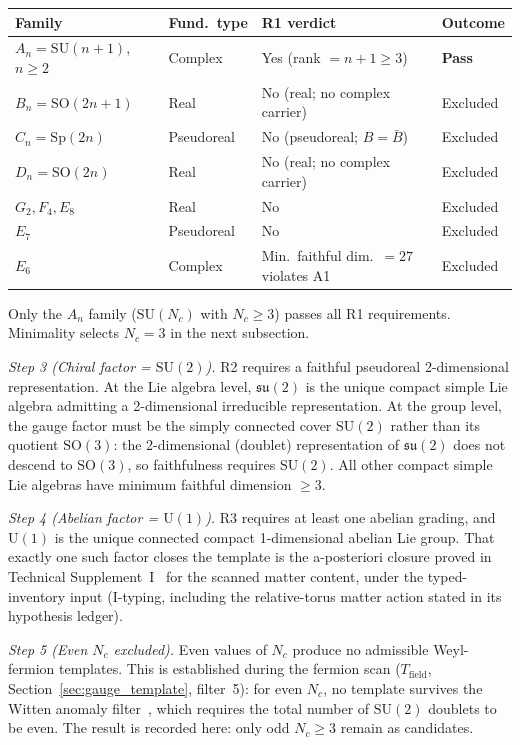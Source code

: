 \documentclass[11pt]{article}
\newcommand{\SU}{\mathrm{SU}}
\newcommand{\U}{\mathrm{U}}
\begin{document}
\begin{tcolorbox}[apfbox, title={Lemma $L_{\mathrm{gauge,unique}}$ (Gauge Template Uniqueness)}]
\smallskip
\begin{center}
\small
\begin{tabular}{llp{4.2cm}l}
\toprule
\textbf{Family} & \textbf{Fund.\ type} & \textbf{R1 verdict} & \textbf{Outcome} \\
\midrule
$A_n = \SU(n\!+\!1)$, $n \ge 2$ & Complex & Yes (rank $= n+1 \ge 3$) & \textbf{Pass} \\
$B_n = \mathrm{SO}(2n\!+\!1)$ & Real & No (real; no complex carrier) & Excluded \\
$C_n = \mathrm{Sp}(2n)$ & Pseudoreal & No (pseudoreal; $B = \bar{B}$) & Excluded \\
$D_n = \mathrm{SO}(2n)$ & Real & No (real; no complex carrier) & Excluded \\
$G_2, F_4, E_8$ & Real & No & Excluded \\
$E_7$ & Pseudoreal & No & Excluded \\
$E_6$ & Complex & Min.\ faithful dim.\ $= 27$ violates A1 & Excluded \\
\bottomrule
\end{tabular}
\end{center}
\smallskip

Only the $A_n$ family ($\SU(N_c)$ with $N_c \ge 3$) passes all R1 requirements.  Minimality selects $N_c = 3$ in the next subsection.

\medskip\noindent\textit{Step 3 (Chiral factor = $\SU(2)$).}  R2 requires a faithful pseudoreal 2-dimensional representation.  At the Lie algebra level, $\mathfrak{su}(2)$ is the unique compact simple Lie algebra admitting a 2-dimensional irreducible representation.  At the group level, the gauge factor must be the simply connected cover $\SU(2)$ rather than its quotient $\mathrm{SO}(3)$: the 2-dimensional (doublet) representation of $\mathfrak{su}(2)$ does not descend to $\mathrm{SO}(3)$, so faithfulness requires $\SU(2)$.  All other compact simple Lie algebras have minimum faithful dimension $\ge 3$.

\medskip\noindent\textit{Step 4 (Abelian factor = $\U(1)$).}  R3 requires at least one abelian grading, and $\U(1)$ is the unique connected compact 1-dimensional abelian Lie group.  That exactly one such factor closes the template is the a-posteriori closure proved in Technical Supplement~I~\cite{BrookeP2Supplement} for the scanned matter content, under the typed-inventory input (I-typing, including the relative-torus matter action stated in its hypothesis ledger).

\medskip\noindent\textit{Step 5 (Even $N_c$ excluded).}  Even values of $N_c$ produce no admissible Weyl-fermion templates.  This is established during the fermion scan ($T_{\mathrm{field}}$, Section~\ref{sec:gauge_template}, filter~5): for even $N_c$, no template survives the Witten anomaly filter~\cite{Witten1982}, which requires the total number of $\SU(2)$ doublets to be even.  The result is recorded here: only odd $N_c \ge 3$ remain as candidates.


\end{tcolorbox}
\end{document}
